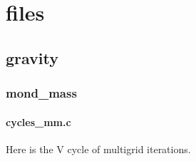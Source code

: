 \documentclass[letterpaper,10pt,english]{sphinxmanual}
\begin{document}
\begin{fulllineitems}

\begin{fulllineitems}
\label{\detokenize{data_structure:c.grids_gravity_mm.verbose_coarse}}%
\pysigstartmultiline
{}%
\pysigstopmultiline
\end{fulllineitems}


\end{fulllineitems}



\chapter{files}
\label{\detokenize{sphinx-c-apidoc/output/files:files}}\label{\detokenize{sphinx-c-apidoc/output/files::doc}}

\section{gravity}
\label{\detokenize{sphinx-c-apidoc/output/gravity/gravity:gravity}}\label{\detokenize{sphinx-c-apidoc/output/gravity/gravity::doc}}

\subsection{mond\_mass}
\label{\detokenize{sphinx-c-apidoc/output/gravity/mond_mass/mond_mass:mond-mass}}\label{\detokenize{sphinx-c-apidoc/output/gravity/mond_mass/mond_mass::doc}}

\subsubsection{cycles\_mm.c}
\label{\detokenize{sphinx-c-apidoc/output/gravity/mond_mass/cycles_mm_c:cycles-mm-c}}\label{\detokenize{sphinx-c-apidoc/output/gravity/mond_mass/cycles_mm_c::doc}}
Here is the V cycle of multigrid iterations.
\end{document}

